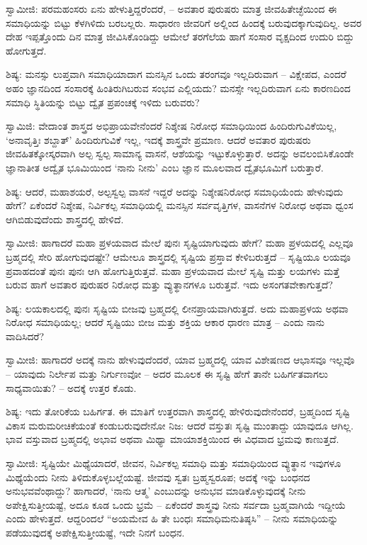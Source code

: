 ಸ್ವಾಮೀಜಿ: ಪರಮಹಂಸರು ಏನು ಹೇಳುತ್ತಿದ್ದರೆಂದರೆ, – ಅವತಾರ ಪುರುಷರು ಮಾತ್ರ ಜೀವಹಿತೇಚ್ಛೆಯಿಂದ ಈ ಸಮಾಧಿಯನ್ನು ಬಿಟ್ಟು ಕೆಳಗಿಳಿದು ಬರಬಲ್ಲರು. ಸಾಧಾರಣ ಜೀವರಿಗೆ ಅಲ್ಲಿಂದ ಹಿಂದಕ್ಕೆ ಬರುವುದಕ್ಕಾಗುವುದಿಲ್ಲ. ಅವರ ದೇಹ ಇಪ್ಪತ್ತೊಂದು ದಿನ ಮಾತ್ರ ಜೀವಿಸಿಕೊಂಡಿದ್ದು ಆಮೇಲೆ ತರಗೆಲೆಯ ಹಾಗೆ ಸಂಸಾರ ವೃಕ್ಷದಿಂದ ಉದುರಿ ಬಿದ್ದು ಹೋಗುತ್ತದೆ.

ಶಿಷ್ಯ: ಮನಸ್ಸು ಲುಪ್ತವಾಗಿ ಸಮಾಧಿಯಾದಾಗ ಮನಸ್ಸಿನ ಒಂದು ತರಂಗವೂ ಇಲ್ಲದಿರುವಾಗ – ವಿಕ್ಷೇಪದ, ಎಂದರೆ ಅಹಂ ಜ್ಞಾನದಿಂದ ಸಂಸಾರಕ್ಕೆ ಹಿಂತಿರುಗಿಬರುವ ಸಂಭವ ಎಲ್ಲಿಯದು? ಮನಸ್ಸೇ ಇಲ್ಲದಿರುವಾಗ ಏನು ಕಾರಣದಿಂದ ಸಮಾಧಿ ಸ್ಥಿತಿಯನ್ನು ಬಿಟ್ಟು ದ್ವೈತ ಪ್ರಪಂಚಕ್ಕೆ ಇಳಿದು ಬರುವರು?

ಸ್ವಾಮಿಜಿ: ವೇದಾಂತ ಶಾಸ್ತ್ರದ ಅಭಿಪ್ರಾಯವೇನೆಂದರೆ ನಿಶ್ಶೇಷ ನಿರೋಧ ಸಮಾಧಿಯಿಂದ ಹಿಂದಿರುಗುವಿಕೆಯಿಲ್ಲ, ‘ಅನಾವೃತ್ತಿಃ ಶಬ್ದಾತ್’ ಹಿಂದಿರುಗುವಿಕೆ ಇಲ್ಲ, ಇದಕ್ಕೆ ಶಾಸ್ತ್ರವೇ ಪ್ರಮಾಣ. ಆದರೆ ಅವತಾರ ಪುರುಷರು ಜೀವಹಿತಕ್ಕೋಸ್ಕರವಾಗಿ ಅಲ್ಪ ಸ್ವಲ್ಪ ಸಾಮಾನ್ಯ ವಾಸನೆ, ಆಶೆಯನ್ನು ಇಟ್ಟುಕೊಳ್ಳುತ್ತಾರೆ. ಅದನ್ನು ಅವಲಂಬಿಸಿಕೊಂಡೇ ಜ್ಞಾನಾತೀತ ಅದ್ವೈತ ಭೂಮಿಯಿಂದ ‘ನಾನು ನೀನು’ ಎಂಬ ಜ್ಞಾನ ಮೂಲವಾದ ದ್ವೈತಭೂಮಿಗೆ ಬರುತ್ತಾರೆ.

ಶಿಷ್ಯ: ಆದರೆ, ಮಹಾಶಯರೆ, ಅಲ್ಪಸ್ವಲ್ಪ ವಾಸನೆ ಇದ್ದರೆ ಅದನ್ನು ನಿಶ್ಶೇಷನಿರೋಧ ಸಮಾಧಿಯೆಂದು ಹೇಳುವುದು ಹೇಗೆ? ಏಕೆಂದರೆ ನಿಶ್ಶೇಷ, ನಿರ್ವಿಕಲ್ಪ ಸಮಾಧಿಯಲ್ಲಿ ಮನಸ್ಸಿನ ಸರ್ವವೃತ್ತಿಗಳ, ವಾಸನೆಗಳ ನಿರೋಧ ಅಥವಾ ಧ್ವಂಸ ಆಗಿಬಿಡುವುದೆಂದು ಶಾಸ್ತ್ರದಲ್ಲಿ ಹೇಳಿದೆ.

ಸ್ವಾಮೀಜಿ: ಹಾಗಾದರೆ ಮಹಾ ಪ್ರಳಯವಾದ ಮೇಲೆ ಪುನಃ ಸೃಷ್ಟಿಯಾಗುವುದು ಹೇಗೆ? ಮಹಾ ಪ್ರಳಯದಲ್ಲಿ ಎಲ್ಲವೂ ಬ್ರಹ್ಮದಲ್ಲಿ ಸೇರಿ ಹೋಗುವುದಷ್ಟೇ? ಆಮೇಲೂ ಶಾಸ್ತ್ರದಲ್ಲಿ ಸೃಷ್ಟಿಯ ಪ್ರಸ್ತಾವ ಕೇಳಿಬರುತ್ತದೆ – ಸೃಷ್ಟಿಯೂ ಲಯವೂ ಪ್ರವಾಹದಂತೆ ಪುನಃ ಪುನಃ ಆಗಿ ಹೋಗುತ್ತಿರುತ್ತವೆ. ಮಹಾ ಪ್ರಳಯವಾದ ಮೇಲೆ ಸೃಷ್ಟಿ ಮತ್ತು ಲಯಗಳು ಮತ್ತೆ ಬರುವ ಹಾಗೆ ಅವತಾರ ಪುರುಷರ ನಿರೋಧ ಮತ್ತು ವ್ಯುತ್ಥಾನಗಳೂ ಬರುತ್ತವೆ. ಇದು ಅಸಂಗತವೇಕಾಗುತ್ತದೆ?

ಶಿಷ್ಯ: ಲಯಕಾಲದಲ್ಲಿ ಪುನಃ ಸೃಷ್ಟಿಯ ಬೀಜವು ಬ್ರಹ್ಮದಲ್ಲಿ ಲೀನಪ್ರಾಯವಾಗಿರುತ್ತದೆ. ಅದು ಮಹಾಪ್ರಳಯ ಅಥವಾ ನಿರೋಧ ಸಮಾಧಿಯಲ್ಲ; ಆದರೆ ಸೃಷ್ಟಿಯು ಬೀಜ ಮತ್ತು ಶಕ್ತಿಯ ಆಕಾರ ಧಾರಣ ಮಾತ್ರ – ಎಂದು ನಾನು ವಾದಿಸಿದರೆ?

ಸ್ವಾಮೀಜಿ: ಹಾಗಾದರೆ ಅದಕ್ಕೆ ನಾನು ಹೇಳುವುದೆಂದರೆ, ಯಾವ ಬ್ರಹ್ಮದಲ್ಲಿ ಯಾವ ವಿಶೇಷಣದ ಆಭಾಸವೂ ಇಲ್ಲವೊ – ಯಾವುದು ನಿರ್ಲೇಪ ಮತ್ತು ನಿರ್ಗುಣವೋ – ಅದರ ಮೂಲಕ ಈ ಸೃಷ್ಟಿ ಹೇಗೆ ತಾನೇ ಬಹಿರ್ಗತವಾಗಲು ಸಾಧ್ಯವಾಯಿತು? – ಅದಕ್ಕೆ ಉತ್ತರ ಕೊಡು.

ಶಿಷ್ಯ: ಇದು ತೋರಿಕೆಯ ಬಹಿರ್ಗತ. ಈ ಮಾತಿಗೆ ಉತ್ತರವಾಗಿ ಶಾಸ್ತ್ರದಲ್ಲಿ ಹೇಳಿರುವುದೇನೆಂದರೆ, ಬ್ರಹ್ಮದಿಂದ ಸೃಷ್ಟಿ ವಿಕಾಸ ಮರುಮರೀಚಿಕೆಯಂತೆ ಕಂಡುಬರುವುದೇನೋ ನಿಜ: ಆದರೆ ವಸ್ತುತಃ ಸೃಷ್ಟಿ ಮುಂತಾದ್ದು ಯಾವುದೂ ಆಗಿಲ್ಲ. ಭಾವ ವಸ್ತುವಾದ ಬ್ರಹ್ಮದಲ್ಲಿ ಅಭಾವ ಅಥವಾ ಮಿಥ್ಯಾ ಮಾಯಾಶಕ್ತಿಯಿಂದ ಈ ವಿಧವಾದ ಭ್ರಮವು ಕಾಣುತ್ತದೆ.

ಸ್ವಾಮೀಜಿ: ಸೃಷ್ಟಿಯೇ ಮಿಥ್ಯೆಯಾದರೆ, ಜೀವನ, ನಿರ್ವಿಕಲ್ಪ ಸಮಾಧಿ ಮತ್ತು ಸಮಾಧಿಯಿಂದ ವ್ಯುತ್ಥಾನ ಇವುಗಳೂ ಮಿಥ್ಯೆಯೆಂದು ನೀನು ತಿಳಿದುಕೊಳ್ಳಬಲ್ಲೆಯಷ್ಟೆ. ಜೀವವು ಸ್ವತಃ ಬ್ರಹ್ಮಸ್ವರೂಪ; ಅದಕ್ಕೆ ಇನ್ನು ಬಂಧನದ ಅನುಭವವೆಂಥಾದ್ದು? ಹಾಗಾದರೆ, ‘ನಾನು ಆತ್ಮ’ ಎಂಬುದನ್ನು ಅನುಭವ ಮಾಡಿಕೊಳ್ಳುವುದಕ್ಕೆ ನೀನು ಅಪೇಕ್ಷಿಸುತ್ತೀಯಷ್ಟೆ, ಅದೂ ಕೂಡ ಒಂದು ಭ್ರಮೆ – ಏಕೆಂದರೆ ಶಾಸ್ತ್ರವು ನೀನು ಸರ್ವದಾ ಬ್ರಹ್ಮವಾಗಿಯೆ ಇದ್ದೀಯೆ ಎಂದು ಹೇಳುತ್ತದೆ. ಆದ್ದರಿಂದಲೆ “ಅಯಮೇವ ಹಿ ತೇ ಬಂಧಃ ಸಮಾಧಿಮನುತಿಷ್ಠಸಿ” – ನೀನು ಸಮಾಧಿಯನ್ನು ಪಡೆಯುವುದಕ್ಕೆ ಅಪೇಕ್ಷಿಸುತ್ತೀಯಷ್ಟೆ, ಇದೇ ನಿನಗೆ ಬಂಧನ.

